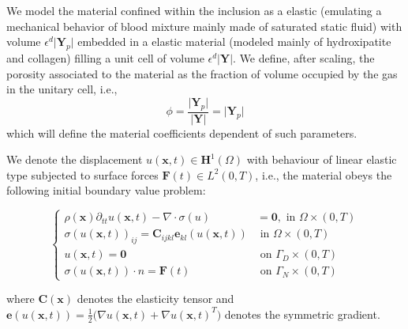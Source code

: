 \begin{rem}
We model the material confined within the inclusion as a elastic (emulating a mechanical behavior of blood mixture mainly made of saturated static fluid) with volume $\epsilon^d \vert \mathbf{Y}_p \vert$ embedded in a elastic material (modeled mainly of hydroxipatite and collagen) filling a unit cell of volume $\epsilon^d \vert \mathbf{Y} \vert$.
We define, after scaling, the porosity associated to the material as the fraction of volume occupied by the gas in the unitary cell, i.e., 
\begin{equation*}
\phi = \frac{\vert \mathbf{Y}_p \vert}{\vert \mathbf{Y} \vert} = \vert \mathbf{Y}_p \vert
\end{equation*}
which will define the material coefficients dependent of such parameters.
\end{rem}

We denote the displacement $u(\mathbf{x},t) \in \mathbf{H}^1(\Omega)$ with behaviour of linear elastic type subjected to surface forces $\mathbf{F}(t) \in L^2 (0, T)$, i.e., the material obeys the following initial boundary value problem:

\begin{equation*}
    \left \{
    \begin{aligned}
        \rho (\mathbf{x}) \partial_{tt} u(\mathbf{x},t) - \nabla \cdot \sigma (u) & = \mathbf{0}, \text{ in } \Omega \times (0, T) \\
        \sigma(u(\mathbf{x},t))_{ij} = \mathbf{C}_{ijkl} \mathbf{e}_{kl}(u(\mathbf{x},t)) & \text{ in } \Omega \times (0, T) \\
        u(\mathbf{x},t) = \mathbf{0} & \text{ on } \Gamma_D \times (0, T) \\
    \sigma(u(\mathbf{x},t)) \cdot n = \mathbf{F}(t) & \text{ on } \Gamma_N \times (0,T)
    \end{aligned}
    \right .
\end{equation*}

where $\mathbf{C}(\mathbf{x})$ denotes the elasticity tensor and $\mathbf{e}(u(\mathbf{x},t)) = \frac{1}{2}\big( \nabla u(\mathbf{x},t) + \nabla u(\mathbf{x},t)^{T}\big)$ denotes the symmetric gradient.


